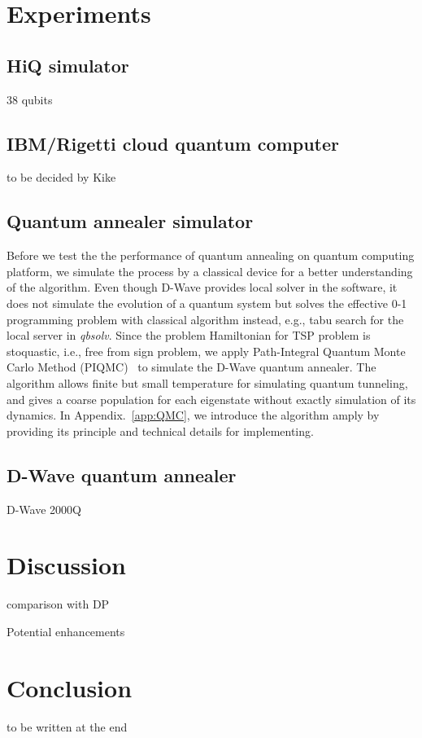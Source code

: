\documentclass[aps,pra,twocolumn,superscriptaddress]{revtex4-2}
\begin{document}
\section{Experiments}
\subsection{HiQ simulator}
38 qubits
\subsection{IBM/Rigetti cloud quantum computer}
to be decided by Kike
\subsection{Quantum annealer simulator}
Before we test the the performance of quantum annealing on quantum computing platform, we simulate the process by a classical device for a better understanding of the algorithm. Even though D-Wave provides local solver in the software, it does not simulate the evolution of a quantum system but solves the effective 0-1 programming problem with classical algorithm instead, e.g., tabu search for the local server in \textit{qbsolv}. Since the problem Hamiltonian for TSP problem is stoquastic, i.e., free from sign problem, we apply Path-Integral Quantum Monte Carlo Method (PIQMC)~\cite{path_integral} to simulate the D-Wave quantum annealer. The algorithm allows finite but small temperature for simulating quantum tunneling, and gives a coarse population for each eigenstate without exactly simulation of its dynamics. In Appendix.~\ref{app:QMC}, we introduce the algorithm amply by providing its principle and technical details for implementing.





\subsection{D-Wave quantum annealer}
D-Wave 2000Q

\section{Discussion}
comparison with DP

Potential enhancements
\section{Conclusion}
to be written at the end
\end{document}
